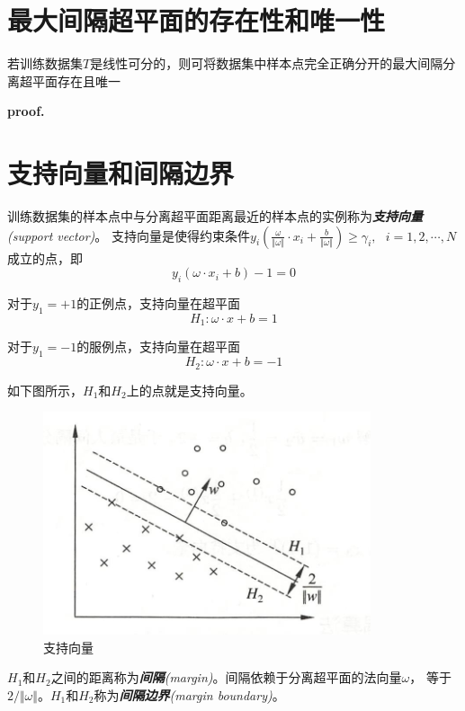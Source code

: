 \section{最大间隔超平面的存在性和唯一性}
\begin{theorem}
    若训练数据集$T$是线性可分的，则可将数据集中样本点完全正确分开的最大间隔分离超平面存在且唯一
\end{theorem}
\textbf{proof. } 


\section{支持向量和间隔边界}

训练数据集的样本点中与分离超平面距离最近的样本点的实例称为\textsl{\textbf{支持向量}(support vector)}。
支持向量是使得约束条件$y_i(\frac{\omega}{\Vert \omega\Vert}\cdot x_i+\frac{b}{
    \Vert \omega\Vert})\geqslant \gamma_i,\ \ \ i=1,2,\cdots,N$成立的点，即
    \begin{equation}
        y_i(\omega\cdot x_i+b)-1=0
    \end{equation}

    对于$y_1=+1$的正例点，支持向量在超平面
    \begin{equation}
        H_1:\omega\cdot x+b=1
    \end{equation}

    对于$y_1=-1$的服例点，支持向量在超平面
    \begin{equation}
        H_2:\omega\cdot x+b=-1
    \end{equation}

如下图所示，$H_1$和$H_2$上的点就是支持向量。

\begin{figure}[H]
    \centering
    \includegraphics[scale=0.6]{figures/支持向量.png}
    \caption{支持向量}
\end{figure}

$H_1$和$H_2$之间的距离称为\textsl{\textbf{间隔}(margin)}。间隔依赖于分离超平面的法向量$\omega$，
等于$2/\Vert\omega\Vert$。$H_1$和$H_2$称为\textsl{\textbf{间隔边界}(margin boundary)}。


